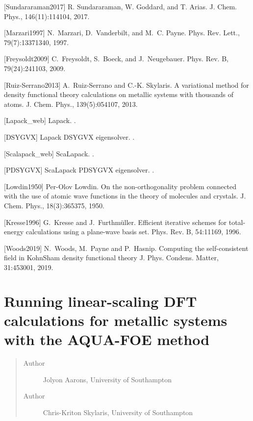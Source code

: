 \documentclass[letterpaper,10pt,english]{sphinxmanual}
\begin{document}
{[}Sundararaman2017{]} R. Sundararaman, W. Goddard, and T. Arias. J. Chem. Phys., 146(11):114104, 2017.

{[}Marzari1997{]} N. Marzari, D. Vanderbilt, and M. C. Payne. Phys. Rev. Lett., 79(7):1337\textendash{}1340, 1997.

{[}Freysoldt2009{]} C. Freysoldt, S. Boeck, and J. Neugebauer. Phys. Rev. B, 79(24):241103, 2009.

{[}Ruiz-Serrano2013{]} A. Ruiz-Serrano and C.-K. Skylaris. A variational method for density functional theory calculations on metallic systems with thousands of atoms. J. Chem. Phys., 139(5):054107, 2013.

{[}Lapack\_web{]} Lapack. .

{[}DSYGVX{]} Lapack DSYGVX eigensolver. .

{[}Scalapack\_web{]} ScaLapack. .

{[}PDSYGVX{]} ScaLapack PDSYGVX eigensolver. .

{[}Lowdin1950{]} Per-Olov Lowdin. On the non-orthogonality problem connected with the use of atomic wave functions in the theory of molecules and crystals. J. Chem. Phys., 18(3):365\textendash{}375, 1950.

{[}Kresse1996{]} G. Kresse and J. Furthmüller. Efficient iterative schemes for  total-energy calculations using a plane-wave basis set. Phys. Rev. B, 54:11169, 1996.

{[}Woods2019{]} N. Woods, M. Payne and P. Hasnip. Computing the self-consistent field in Kohn\textendash{}Sham density functional theory J. Phys. Condens. Matter, 31:453001, 2019.


\section{Running linear-scaling DFT calculations for metallic systems with the AQUA-FOE method}
\label{\detokenize{AQUA-FOE::doc}}\label{\detokenize{AQUA-FOE:running-linear-scaling-dft-calculations-for-metallic-systems-with-the-aqua-foe-method}}\begin{quote}\begin{description}
\item[{Author}] \leavevmode
Jolyon Aarons, University of Southampton

\item[{Author}] \leavevmode
Chris-Kriton Skylaris, University of Southampton

\end{description}\end{quote}
\end{document}
